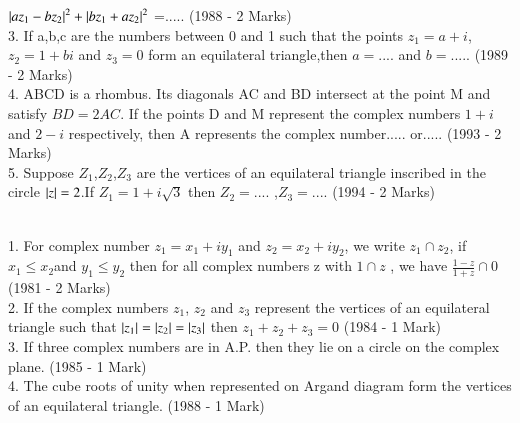 \documentclass[journal,12pt,twocolumn]{IEEEtran}
\theoremstyle{remark}
\begin{document}
$\left\vert az_1-bz_2\right\vert^2+\left\vert bz_1+az_2\right\vert^2$ =.....  \hfill(1988 - 2 Marks)\\
3.  If a,b,c are the numbers between 0 and 1 such that the points $z_1=a+i$, $z_2=1+bi$ and $z_3=0$ form an equilateral triangle,then $a=....$ and $b=.....$ \hfill(1989 - 2 Marks)\\
4.  ABCD is a rhombus. Its diagonals AC and BD intersect at the point M and satisfy $BD=2AC$. If the points D and M represent the complex numbers $1+i$ and $2-i$ respectively, then A represents the complex number..... or..... \hfill(1993 - 2 Marks)\\
5.  Suppose $Z_1$,$Z_2$,$Z_3$ are the vertices of an equilateral triangle inscribed in the circle $\left\vert z\right\vert=2$.If $Z_1=1+i\sqrt{3}$ then $Z_2=....$ ,$Z_3=.... $ \hfill(1994 - 2 Marks)\\
\\
1.  For complex number $z_1=x_1+iy_1 $ and $z_2=x_2+iy_2$, we write $z_1\cap z_2$, if $x_1\leq x_2 $and $y_1\leq y_2 $ then for all complex numbers z with $1\cap z$ , we have $\frac{1-z}{1+z} \cap 0$  \hfill(1981 - 2 Marks)\\
2.  If the complex numbers $z_1$, $z_2$ and $z_3 $ represent the vertices of an equilateral triangle such that $ \left\vert z_1\right\vert = \left\vert z_2\right\vert=\left\vert z_3\right\vert $ then $z_1+z_2+z_3 = 0$ \hfill(1984 - 1 Mark)\\
3.  If three complex numbers are in A.P. then they lie on a circle on the complex plane. \hfill(1985 - 1 Mark)\\
4.  The cube roots of unity when represented on Argand diagram form the vertices of an equilateral triangle. \hfill(1988 - 1 Mark)\\
\\
\end{document}
